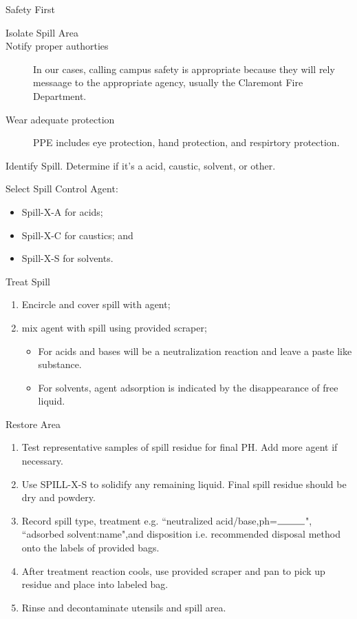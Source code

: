\documentclass[12pt]{../SOP4_alpha}\usepackage[]{graphicx}\usepackage[]{color}
\begin{document}
\NP Safety First

\begin{description}
\item[Isolate Spill Area] 
\item[Notify proper authorties] In our cases, calling campus safety is appropriate because they will rely messaage to the appropriate agency, usually the Claremont Fire Department.
\item[Wear adequate protection] PPE includes eye protection, hand protection, and respirtory protection. 
\end{description}

\NP Identify Spill. Determine if it's a acid, caustic, solvent, or other. 

\NP Select Spill Control Agent:

\begin{itemize}
  \item Spill-X-A for acids;
  \item Spill-X-C for caustics; and
  \item Spill-X-S for solvents.
\end{itemize}

\NP Treat Spill 

\begin{enumerate}
  \item Encircle and cover spill with agent;
  \item mix agent with spill using provided scraper; 
\begin{itemize}
  \item For acids and bases will be a neutralization reaction and leave a paste like substance. 
  \item For solvents, agent adsorption is indicated by the disappearance of free liquid.
\end{itemize} 
\end{enumerate}
  
\NP Restore Area
\begin{enumerate} 
  \item Test representative samples of spill residue for final PH. Add more agent if necessary. 
  \item Use SPILL-X-S to solidify any remaining liquid. Final spill residue should be dry and powdery.
  \item Record spill type, treatment e.g. ``neutralized acid/base,ph=$\rule{1cm}{0.15mm}$", ``adsorbed solvent:name",and disposition i.e. recommended disposal method onto the labels of provided bags. 
  \item After treatment reaction cools, use provided scraper and pan to pick up residue and place into labeled bag.
  \item Rinse and decontaminate utensils and spill area.
\end{enumerate}
\end{document}
